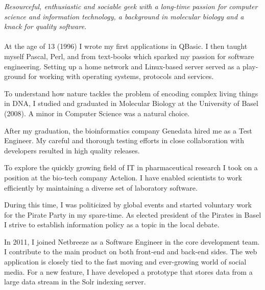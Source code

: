 \documentclass[10pt,a4paper]{article}
\begin{document}
\vspace{-1.3em}  %
\begin{multicols}{2}  %
\noindent \emph{Resourceful, enthusiastic and sociable geek with a long-time passion for computer science and information technology, a background in molecular biology and a knack for quality software.}
\\
\\
At the age of 13 (1996) I wrote my first applications in QBasic. I then taught myself Pascal, Perl,  and  from text-books which sparked my passion for software engineering. Setting up a home network and Linux-based server served as a play-ground for working with operating systems, protocols and services.

To understand how nature tackles the problem of encoding complex living things in DNA, I studied and graduated in Molecular Biology at the University of Basel (2008). A minor in Computer Science was a natural choice.

After my graduation, the bioinformatics company Genedata hired me as a Test Engineer. My careful and thorough testing efforts in close collaboration with developers resulted in high quality releases.

To explore the quickly growing field of IT in pharmaceutical research I took on a position at the bio-tech company Actelion. I have enabled scientists to work efficiently by maintaining a diverse set of laboratory software. 

During this time, I was politicized by global events and started voluntary work for the Pirate Party in my spare-time. As elected president of the Pirates in Basel I strive to establish information policy as a topic in the local debate.

In 2011, I joined Netbreeze as a Software Engineer in the core development team. I contribute to the main product on both front-end and back-end sides. The web application is closely tied to the fast moving and ever-growing world of social media. For a new feature, I have developed a prototype that stores data from a large data stream in the Solr indexing server.
\end{multicols}


\spacedhrule{0em}{-0.4em}

\end{document}
